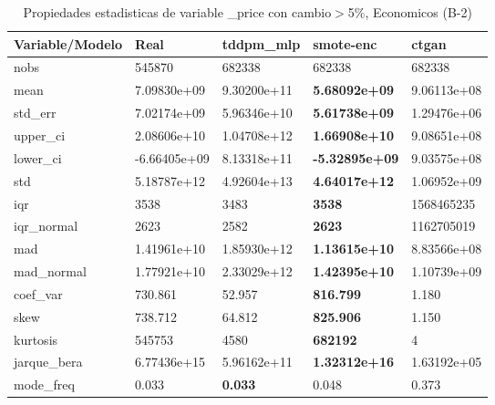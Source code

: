 \begin{table}[H]
\centering
\fontsize{8}{14}\selectfont
\caption{Propiedades estadisticas de variable \_price con cambio\ensuremath{>}5\%, Economicos (B-2)}
\label{table-stats-economicos-b-2-_price-short}
\begin{tabular}{|l|m{10em}|m{10em}|m{10em}|m{10em}|}
\hline
 \rowcolor[gray]{0.8}
Variable/Modelo & Real & tddpm\_mlp & smote-enc & ctgan \\
\hline nobs & 545870 & 682338 & 682338 & 682338 \\
\hline mean & 7.09830e+09 & \cellcolor[rgb]{0.9, 0.54, 0.52} 9.30200e+11 & \bfseries 5.68092e+09 & 9.06113e+08 \\
\hline std\_err & 7.02174e+09 & \cellcolor[rgb]{0.9, 0.54, 0.52} 5.96346e+10 & \bfseries 5.61738e+09 & 1.29476e+06 \\
\hline upper\_ci & 2.08606e+10 & \cellcolor[rgb]{0.9, 0.54, 0.52} 1.04708e+12 & \bfseries 1.66908e+10 & 9.08651e+08 \\
\hline lower\_ci & -6.66405e+09 & \cellcolor[rgb]{0.9, 0.54, 0.52} 8.13318e+11 & \bfseries -5.32895e+09 & 9.03575e+08 \\
\hline std & 5.18787e+12 & \cellcolor[rgb]{0.9, 0.54, 0.52} 4.92604e+13 & \bfseries 4.64017e+12 & 1.06952e+09 \\
\hline iqr & 3538 & 3483 & \bfseries 3538 & \cellcolor[rgb]{0.9, 0.54, 0.52} 1568465235 \\
\hline iqr\_normal & 2623 & 2582 & \bfseries 2623 & \cellcolor[rgb]{0.9, 0.54, 0.52} 1162705019 \\
\hline mad & 1.41961e+10 & \cellcolor[rgb]{0.9, 0.54, 0.52} 1.85930e+12 & \bfseries 1.13615e+10 & 8.83566e+08 \\
\hline mad\_normal & 1.77921e+10 & \cellcolor[rgb]{0.9, 0.54, 0.52} 2.33029e+12 & \bfseries 1.42395e+10 & 1.10739e+09 \\
\hline coef\_var & 730.861 & 52.957 & \bfseries 816.799 & \cellcolor[rgb]{0.9, 0.54, 0.52} 1.180 \\
\hline skew & 738.712 & 64.812 & \bfseries 825.906 & \cellcolor[rgb]{0.9, 0.54, 0.52} 1.150 \\
\hline kurtosis & 545753 & 4580 & \bfseries 682192 & \cellcolor[rgb]{0.9, 0.54, 0.52} 4 \\
\hline jarque\_bera & 6.77436e+15 & 5.96162e+11 & \bfseries 1.32312e+16 & \cellcolor[rgb]{0.9, 0.54, 0.52} 1.63192e+05 \\
\hline mode\_freq & 0.033 & \bfseries 0.033 & 0.048 & \cellcolor[rgb]{0.9, 0.54, 0.52} 0.373 \\

\end{tabular}
\end{table}
